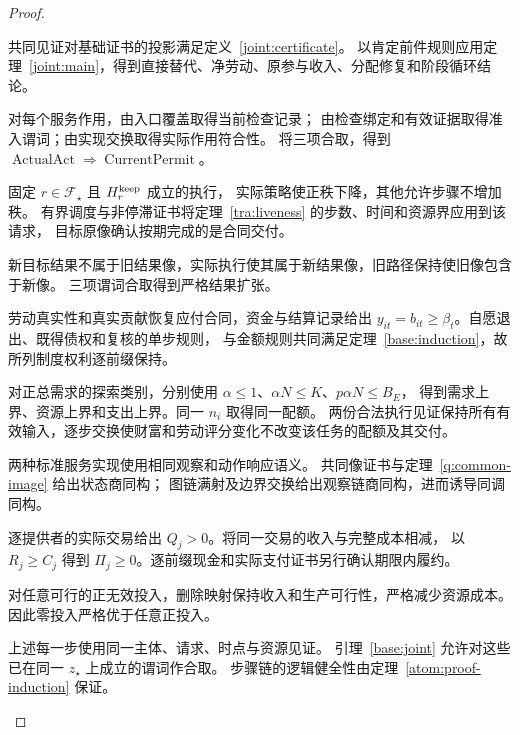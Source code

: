 \documentclass[UTF8,12pt,a4paper,openany,fontset=none,zihao=false]{ctexrep}
\theoremstyle{definition}
\newcommand{\1}{\mathbf 1}
\begin{document}
\begin{proof}
\begin{semanticsteps}
\item 共同见证对基础证书的投影满足定义~\ref{joint:certificate}。
以肯定前件规则应用定理~\ref{joint:main}，得到直接替代、净劳动、原参与收入、分配修复和阶段循环结论。
\item 对每个服务作用，由入口覆盖取得当前检查记录；
由检查绑定和有效证据取得准入谓词；由实现交换取得实际作用符合性。
将三项合取，得到 \(\operatorname{ActualAct}\Rightarrow\operatorname{CurrentPermit}\)。
\item 固定 \(r\in\mathcal F_\star\) 且 \(H_r^{\rm keep}\) 成立的执行，
实际策略使正秩下降，其他允许步骤不增加秩。
有界调度与非停滞证书将定理~\ref{tra:liveness} 的步数、时间和资源界应用到该请求，
目标原像确认按期完成的是合同交付。
\item 新目标结果不属于旧结果像，实际执行使其属于新结果像，旧路径保持使旧像包含于新像。
三项谓词合取得到严格结果扩张。
\item 劳动真实性和真实贡献恢复应付合同，资金与结算记录给出
\(y_{it}=b_{it}\ge\beta_t\)。自愿退出、既得债权和复核的单步规则，
与金额规则共同满足定理~\ref{base:induction}，故所列制度权利逐前缀保持。
\item 对正总需求的探索类别，分别使用
\(\alpha\le1\)、\(\alpha N\le K\)、\(p\alpha N\le B_E\)，
得到需求上界、资源上界和支出上界。同一 \(n_i\) 取得同一配额。
两份合法执行见证保持所有有效输入，逐步交换使财富和劳动评分变化不改变该任务的配额及其交付。
\item 两种标准服务实现使用相同观察和动作响应语义。
共同像证书与定理~\ref{q:common-image} 给出状态商同构；
图链满射及边界交换给出观察链商同构，进而诱导同调同构。
\item 逐提供者的实际交易给出 \(Q_j>0\)。将同一交易的收入与完整成本相减，
以 \(R_j\ge C_j\) 得到 \(\Pi_j\ge0\)。逐前缀现金和实际支付证书另行确认期限内履约。
\item 对任意可行的正无效投入，删除映射保持收入和生产可行性，严格减少资源成本。
因此零投入严格优于任意正投入。
\item 上述每一步使用同一主体、请求、时点与资源见证。
引理~\ref{base:joint} 允许对这些已在同一 \(z_\star\) 上成立的谓词作合取。
步骤链的逻辑健全性由定理~\ref{atom:proof-induction} 保证。
\end{semanticsteps}
\end{proof}
\end{document}
